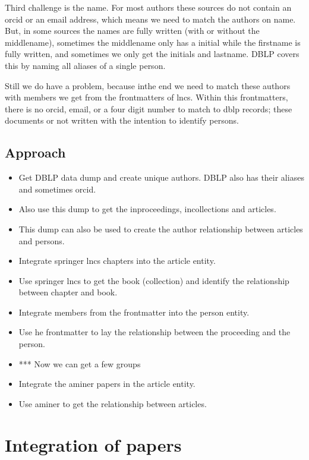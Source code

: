 \documentclass{ou-report}
\begin{document}
Third challenge is the name. For most authors these sources do not contain an
orcid or an email address, which means we need to match the authors on name.
But, in some sources the names are fully written (with or without the 
middlename), sometimes the middlename only has a initial while the firstname is 
fully written, and sometimes we only get the initials and lastname.
DBLP covers this by naming all aliases of a single person.

Still we do have a problem, because inthe end we need to match these authors
with members we get from the frontmatters of lncs. Within this frontmatters, 
there is no orcid, email, or a four digit number to match to dblp records; these
documents or not written with the intention to identify persons.

\subsection{Approach}
\begin{itemize}
    \item Get DBLP data dump and create unique authors. DBLP also has their 
        aliases and sometimes orcid.
    \item Also use this dump to get the inproceedings, incollections and 
        articles.
    \item This dump can also be used to create the author relationship between 
        articles and persons.
    \item Integrate springer lncs chapters into the article entity.
    \item Use springer lncs to get the book (collection) and identify the 
        relationship between chapter and book.
    \item Integrate members from the frontmatter into the person entity.
    \item Use he frontmatter to lay the relationship between the proceeding and
        the person.
    \item *** Now we can get a few groups
    \item Integrate the aminer papers in the article entity.
    \item Use aminer to get the relationship between articles.
\end{itemize}

\section{Integration of papers}
\end{document}

